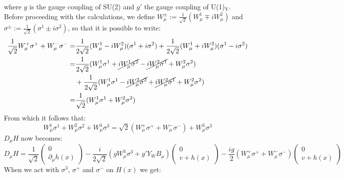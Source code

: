 \documentclass[../main.tex]{subfiles}
\begin{document}
where $g$ is the gauge coupling of SU(2) and $g'$ the gauge coupling of U(1)$_{\text{Y}}$.\\
Before proceeding with the calculations, we define $W_\mu^\pm:=\frac{1}{\sqrt{2}}(W_\mu^1\mp iW_\mu^2)$ and $\sigma^\pm:=\frac{1}{\sqrt{2}}(\sigma^1\pm i\sigma^2)$, so that it is possible to write:
\begin{align*}
\frac{1}{\sqrt{2}}W_\mu^+\sigma^++W_\mu^-\sigma^-=&\frac{1}{2\sqrt{2}}(W_\mu^1-iW_\mu^2)(\sigma^1+i\sigma^2)+\frac{1}{2\sqrt{2}}(W_\mu^1+iW_\mu^2)(\sigma^1-i\sigma^2)\\
=&\frac{1}{2\sqrt{2}}(W_\mu^1\sigma^1+\cancel{iW_\mu^1\sigma^2}-\cancel{iW_\mu^2\sigma^1}+W_\mu^2\sigma^2)\\
&+\frac{1}{2\sqrt{2}}(W_\mu^1\sigma^1-\cancel{iW_\mu^2\sigma^2}+\cancel{iW_\mu^2\sigma^1}+W_\mu^2\sigma^2)\\
=&\frac{1}{\sqrt{2}}(W_\mu^1\sigma^1+W_\mu^2\sigma^2)
\end{align*}
From which it follows that:
\[
W_\mu^1\sigma^1+W_\mu^2\sigma^2+W_\mu^3\sigma^3=\sqrt{2}(W_\mu^+\sigma^++W_\mu^-\sigma^-)+W_\mu^3\sigma^3
\]
$D_\mu H$ now becomes:
\[
D_\mu H=\frac{1}{\sqrt{2}}\begin{pmatrix}0 \\ \partial_\mu h(x)\end{pmatrix}-\frac{i}{2\sqrt{2}}(gW_\mu^3\sigma^3+g'Y_WB_\mu)\begin{pmatrix}0 \\ v+h(x)\end{pmatrix}-\frac{ig}{2}(W_\mu^+\sigma^++W_\mu^-\sigma^-)\begin{pmatrix}0 \\ v+h(x)\end{pmatrix}
\]
When we act with $\sigma^3$, $\sigma^+$ and $\sigma^-$ on $H(x)$ we get:
\end{document}

